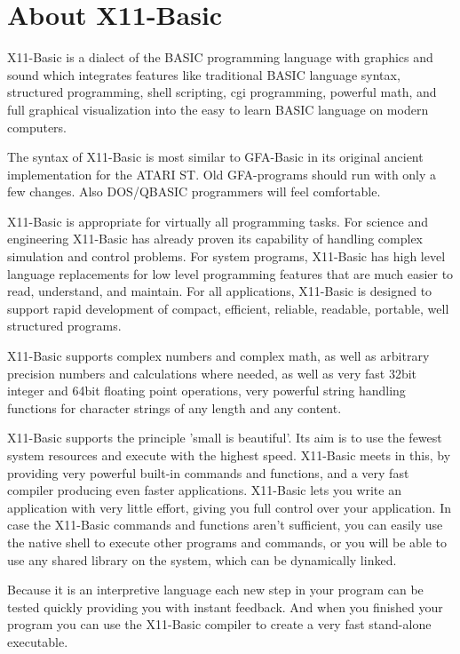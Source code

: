 \chapter{About X11-Basic}

X11-Basic is a dialect of the BASIC programming language with graphics and sound
which integrates features like traditional BASIC language syntax, structured
programming, shell scripting, cgi programming, powerful math, and full graphical
visualization into the easy to learn BASIC language on modern computers.

The syntax of X11-Basic is most similar to GFA-Basic in its original ancient 
implementation for the ATARI ST. Old GFA-programs should run with only a few 
changes. Also DOS/\-QBASIC programmers will feel comfortable.

X11-Basic is 
appropriate for virtually all programming tasks. For science and engineering
X11-Basic has already proven its capability of handling complex simulation
and control problems. For system programs, X11-Basic has high level language
replacements for low level programming features that are much easier to read,
understand, and maintain. For all applications, X11-Basic is designed to support
rapid development of compact, efficient, reliable, readable, portable, well
structured programs.

X11-Basic supports complex numbers and complex math, as well as arbitrary 
precision numbers and calculations where needed, as well as very fast 32bit 
integer and 64bit floating point operations, very powerful string handling 
functions for character strings of any length and any content. 

X11-Basic supports the principle 'small is beautiful'. Its aim is to use the 
fewest system resources and execute with the highest speed. 
X11-Basic meets in
this, by providing very powerful built-in commands and functions, and a very fast
compiler producing even faster applications. X11-Basic lets you write an
application with very little effort, giving you full control over your
application. In case the
X11-Basic commands and functions aren't sufficient, you can easily use the
native shell to execute other programs and commands, or you will be able to use
any shared library on the system, which can be dynamically linked.

Because it is an interpretive language each new step in your program can be
tested quickly providing you with instant feedback. And when you finished your
program you can use the X11-Basic compiler to create a very fast stand-alone
executable. 

